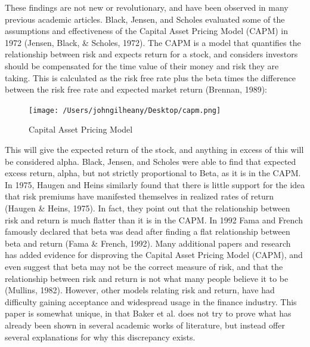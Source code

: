 \documentclass[12pt,twoside]{reedthesis}
\theoremstyle{definition}
\theoremstyle{definition}
\theoremstyle{definition}
\theoremstyle{remark}
\begin{document}
These findings are not new or revolutionary, and have been observed in
many previous academic articles. Black, Jensen, and Scholes evaluated
some of the assumptions and effectiveness of the Capital Asset Pricing
Model (CAPM) in 1972 (Jensen, Black, \& Scholes, 1972). The CAPM is a
model that quantifies the relationship between risk and expects return
for a stock, and considers investors should be compensated for the time
value of their money and risk they are taking. This is calculated as the
risk free rate plus the beta times the difference between the risk free
rate and expected market return (Brennan, 1989):
\begin{figure}
\centerline{\texttt{[image: /Users/johngilheany/Desktop/capm.png]}}
\caption{Capital Asset Pricing Model}
\label{CAPM}
\end{figure}
This will give the expected return of the stock, and anything in excess
of this will be considered alpha. Black, Jensen, and Scholes were able
to find that expected excess return, alpha, but not strictly
proportional to Beta, as it is in the CAPM. In 1975, Haugen and Heins
similarly found that there is little support for the idea that risk
premiums have manifested themselves in realized rates of return (Haugen
\& Heins, 1975). In fact, they point out that the relationship between
risk and return is much flatter than it is in the CAPM. In 1992 Fama and
French famously declared that beta was dead after finding a flat
relationship between beta and return (Fama \& French, 1992). Many
additional papers and research has added evidence for disproving the
Capital Asset Pricing Model (CAPM), and even suggest that beta may not
be the correct measure of risk, and that the relationship between risk
and return is not what many people believe it to be (Mullins, 1982).
However, other models relating risk and return, have had difficulty
gaining acceptance and widespread usage in the finance industry. This
paper is somewhat unique, in that Baker et al. does not try to prove
what has already been shown in several academic works of literature, but
instead offer several explanations for why this discrepancy exists.
\end{document}
